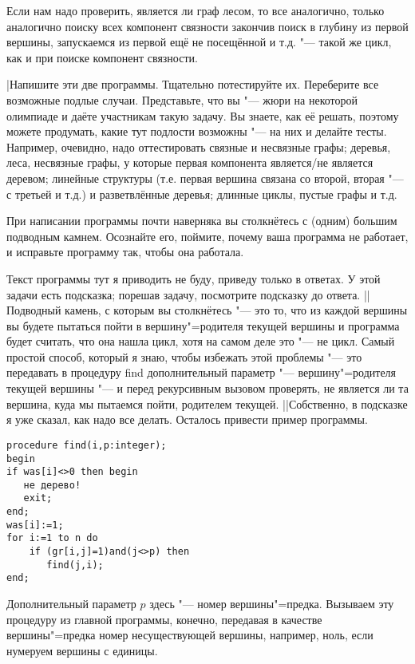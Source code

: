 Если нам надо проверить, является ли граф лесом, то все аналогично, только аналогично поиску всех 
компонент связности закончив поиск в глубину из первой вершины, запускаемся из первой ещё не 
посещённой и т.д. "--- такой же цикл, как и при поиске компонент связности.

\task|Напишите эти две программы. Тщательно потестируйте их. Переберите все возможные 
подлые случаи. Представьте, что вы "--- жюри на некоторой олимпиаде и даёте участникам такую 
задачу. Вы знаете, как её решать, поэтому можете продумать, какие тут подлости возможны "--- на них 
и делайте тесты. Например, очевидно, надо оттестировать связные и несвязные графы; деревья, леса, 
несвязные графы, у которые первая компонента является/не является деревом; линейные структуры (т.е. 
первая вершина связана со второй, вторая "--- с третьей и т.д.) и разветвлённые деревья; длинные 
циклы, пустые графы и т.д. 

При написании программы почти наверняка вы столкнётесь с (одним) большим подводным камнем. Осознайте его, 
поймите, почему ваша программа не работает, и исправьте программу так, чтобы она работала.

Текст программы тут я приводить не буду, приведу только в ответах. У этой задачи есть подсказка;
порешав задачу, посмотрите подсказку до ответа.
||Подводный камень, с которым вы столкнётесь "--- это то, что из каждой вершины
вы будете пытаться пойти в вершину"=родителя текущей вершины и программа будет считать, что она нашла цикл, 
хотя на самом деле это "--- не цикл. Самый простой способ, который я знаю, чтобы избежать этой проблемы
"--- это передавать в процедуру find дополнительный параметр "--- вершину"=родителя текущей вершины "--- и 
перед рекурсивным вызовом проверять, не является ли та вершина, куда мы пытаемся пойти, родителем текущей.
||Собственно, в подсказке я уже сказал, как надо все делать. Осталось привести пример программы.
\begin{codesampleo}\begin{verbatim}
procedure find(i,p:integer);
begin
if was[i]<>0 then begin
   не дерево!
   exit;
end;
was[i]:=1;
for i:=1 to n do
    if (gr[i,j]=1)and(j<>p) then
       find(j,i);
end;
\end{verbatim}
\end{codesampleo}
Дополнительный параметр $p$ здесь "--- номер вершины"=предка. Вызываем эту процедуру из главной программы, 
конечно, передавая в качестве 
вершины"=предка номер несуществующей вершины, например, ноль, если нумеруем вершины с единицы.

